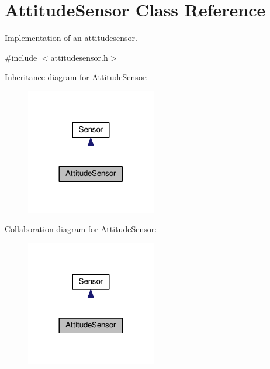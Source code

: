 \hypertarget{classAttitudeSensor}{}\section{Attitude\+Sensor Class Reference}
\label{classAttitudeSensor}


Implementation of an attitudesensor.  




{\ttfamily \#include $<$attitudesensor.\+h$>$}



Inheritance diagram for Attitude\+Sensor\+:\nopagebreak
\begin{figure}[H]
\begin{center}
\leavevmode
\includegraphics[width=161pt]{classAttitudeSensor__inherit__graph}
\end{center}
\end{figure}


Collaboration diagram for Attitude\+Sensor\+:\nopagebreak
\begin{figure}[H]
\begin{center}
\leavevmode
\includegraphics[width=161pt]{classAttitudeSensor__coll__graph}
\end{center}
\end{figure}
